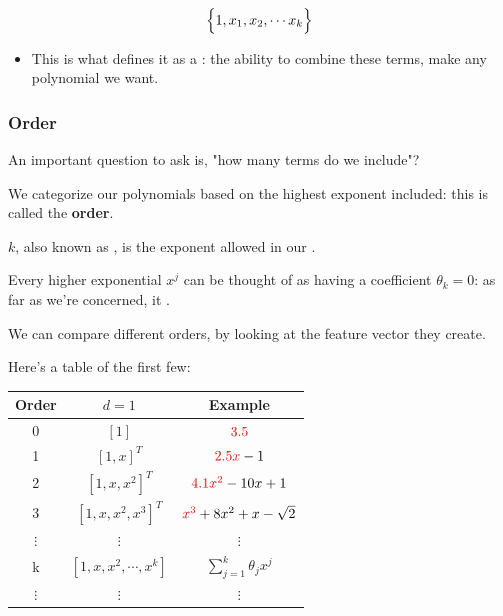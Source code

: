             \begin{equation}
                \Bigl\{1, x_1, x_2, \cdots x_k\Bigr\}
            \end{equation}

            \begin{itemize}
                \item This is what defines it as a : the ability to combine these terms, make any polynomial we want.
            \end{itemize}
            

    
            
            \subsubsection{Order}
            
                An important question to ask is, "how many terms do we include"?

                We categorize our polynomials based on the highest exponent included: this is called the \textbf{order}.\\

                \begin{definition}
                     $k$, also known as , is the  exponent allowed in our . 

                    Every higher exponential $x^{j}$ can be thought of as having a coefficient $\theta_k=0$: as far as we're concerned, it .
                \end{definition}

                \miniex We can compare different orders, by looking at the feature vector they create.

                Here's a table of the first few:\\

                \begin{center}
                    \begin{tabular}{c c c}
                    Order & $d=1$ & Example \\
                    \hline
                    0 & $[1]$ & $\textcolor{red}{3.5}$  \\
                    1 & $[1,x]^T$ & $\textcolor{red}{2.5x}-1$ \\
                    2 & $[1,x,x^2]^T$ & $\textcolor{red}{4.1x^2}-10x+1$ \\
                    3 & $[1,x,x^2,x^3]^T$ & $\textcolor{red}{x^3}+8x^2+x-\sqrt{2}$ \\
                    $\vdots$ & $\vdots$ & $\vdots$ \\
                    k & $[1, x, x^2, \cdots, x^k]$ & $\sum_{j=1}^k \theta_jx^j$ \\
                    $\vdots$ & $\vdots$ & $\vdots$
                    \end{tabular}
                \end{center}

